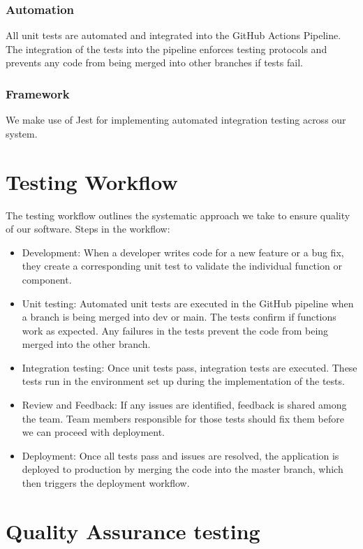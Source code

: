 \documentclass[a4paper,12pt]{article}
\begin{document}
\subsubsection{Automation}

All unit tests are automated and integrated into the GitHub Actions Pipeline. The integration of the tests into the pipeline enforces testing protocols and prevents any code from being merged into other branches if tests fail.

\subsubsection{Framework}

We make use of Jest for implementing automated integration testing across our system.

\section{Testing Workflow}

The testing workflow outlines the systematic approach we take to ensure quality of our software.
Steps in the workflow:
\begin{itemize}
    \item Development: When a developer writes code for a new feature or a bug fix, they create a corresponding unit test to validate the individual function or component.
    \item Unit testing: Automated unit tests are executed in the GitHub pipeline when a branch is being merged into dev or main. The tests confirm if functions work as expected. Any failures in the tests prevent the code from being merged into the other branch.
    \item Integration testing: Once unit tests pass, integration tests are executed. These tests run in the environment set up during the implementation of the tests.
    \item Review and Feedback: If any issues are identified, feedback is shared among the team. Team members responsible for those tests should fix them before we can proceed with deployment.
    \item Deployment: Once all tests pass and issues are resolved, the application is deployed to production by merging the code into the master branch, which then triggers the deployment workflow.
\end{itemize}

\section{Quality Assurance testing}
\end{document}
